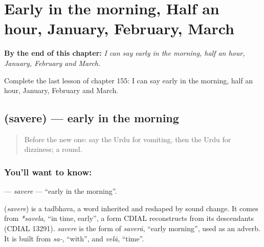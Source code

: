 
\chapter{Early in the morning, Half an hour, January, February, March}
\label{ch:ur-early-in-the-morning-half-an-hour-january-february-march}

\begin{chapteropening}
\textbf{By the end of this chapter:} \emph{I can say early in the morning, half an hour, January, February and March.}

Complete the last lesson of chapter 155: I can say early in the morning, half an hour, January, February and March.
\end{chapteropening}

\section[\texorpdfstring{\ur{سویرے} (savere)}{سویرے (savere)}]{ (savere) — early in the morning}

\label{lesson:UR-C155-savere}



\begin{quote}
Before the new one: say the Urdu for vomiting, then the Urdu for dizziness; a round.
\end{quote}

\subsection*{You'll want to know: }
\textbf{} — \emph{savere} — \textquotedblleft{}early in the morning\textquotedblright{}.

\begin{cousinweb}
\textbf{} (\emph{savere}) is a tadbhava, a word inherited and reshaped by sound change. It comes from \emph{*savela}, \textquotedblleft{}in time, early\textquotedblright{}, a form CDIAL reconstructs from its descendants (CDIAL 13291). \emph{savere} is the form of \emph{saverā}, \textquotedblleft{}early morning\textquotedblright{}, used as an adverb. It is built from \emph{sa-}, \textquotedblleft{}with\textquotedblright{}, and \emph{velā}, \textquotedblleft{}time\textquotedblright{}.
\end{cousinweb}

